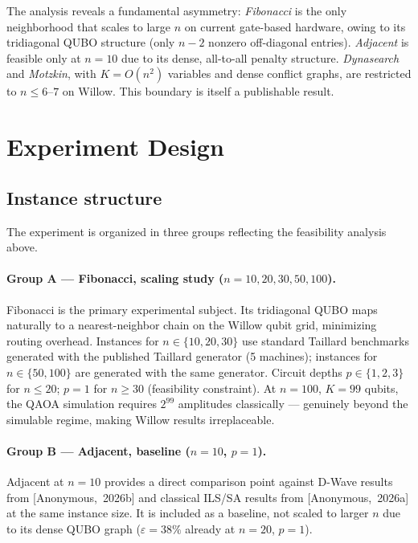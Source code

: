 \documentclass[11pt,a4paper]{article}
\newcommand{\anonA}{[Anonymous,~2026a]}
\newcommand{\anonB}{[Anonymous,~2026b]}
\begin{document}
The analysis reveals a fundamental asymmetry: \emph{Fibonacci} is the
only neighborhood that scales to large $n$ on current gate-based hardware,
owing to its tridiagonal QUBO structure (only $n-2$ nonzero off-diagonal
entries). \emph{Adjacent} is feasible only at $n=10$ due to its dense,
all-to-all penalty structure. \emph{Dynasearch} and \emph{Motzkin}, with
$K=O(n^2)$ variables and dense conflict graphs, are restricted to
$n \le 6$--$7$ on Willow. This boundary is itself a publishable result.

\section*{Experiment Design}

\subsection*{Instance structure}

The experiment is organized in three groups reflecting the feasibility
analysis above.

\paragraph{Group A --- Fibonacci, scaling study ($n = 10, 20, 30, 50, 100$).}
Fibonacci is the primary experimental subject. Its tridiagonal QUBO
maps naturally to a nearest-neighbor chain on the Willow qubit grid,
minimizing routing overhead. Instances for $n \in \{10, 20, 30\}$ use
standard Taillard benchmarks generated with the published Taillard
generator (5 machines); instances for $n \in \{50, 100\}$ are generated
with the same generator. Circuit depths $p \in \{1,2,3\}$ for $n \le 20$;
$p = 1$ for $n \ge 30$ (feasibility constraint). At $n=100$, $K=99$
qubits, the QAOA simulation requires $2^{99}$ amplitudes classically ---
genuinely beyond the simulable regime, making Willow results irreplaceable.

\paragraph{Group B --- Adjacent, baseline ($n = 10$, $p = 1$).}
Adjacent at $n=10$ provides a direct comparison point against D-Wave
results from \anonB{} and classical ILS/SA results from \anonA{} at the
same instance size. It is included as a baseline, not scaled to larger $n$
due to its dense QUBO graph ($\varepsilon = 38\%$ already at $n=20$,
$p=1$).
\end{document}
